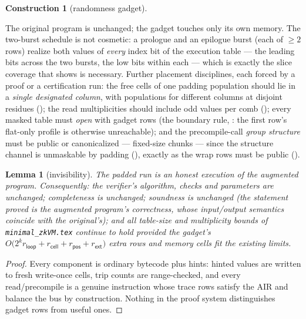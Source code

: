 \documentclass{article}
\newtheorem{lemma}[theorem]{Lemma}
\theoremstyle{definition}
\newtheorem{construction}[theorem]{Construction}
\begin{document}
\begin{construction}[randomness gadget]
\begin{itemize}
\end{itemize}
The original program is unchanged; the gadget touches only its own memory. The two-burst schedule is not cosmetic: a prologue and an epilogue burst (each of $\geq 2$ rows) realize both values of \emph{every} index bit of the execution table --- the leading bits across the two bursts, the low bits within each --- which is exactly the slice coverage that  shows is necessary. Further placement disciplines, each forced by a proof or a certification run: the free cells of one padding population should lie in a \emph{single designated column}, with populations for different columns at disjoint residues (); the read multiplicities should include odd values per comb (); every masked table must \emph{open} with gadget rows (the boundary rule, : the first row's flat-only profile is otherwise unreachable); and the precompile-call \emph{group structure} must be public or canonicalized --- fixed-size chunks --- since the structure channel is unmaskable by padding (), exactly as the wrap rows must be public ().
\end{construction}

\begin{lemma}[invisibility]\label{lem:invisible}
The padded run is an honest execution of the augmented program. Consequently: the verifier's algorithm, checks and parameters are unchanged; completeness is unchanged; soundness is unchanged (the statement proved is the augmented program's correctness, whose input/output semantics coincide with the original's); and all table-size and multiplicity bounds of \texttt{minimal\_zkVM.tex} continue to hold provided the gadget's $O\big(2^k r_{\mathsf{loop}} + r_{\mathsf{cell}} + r_{\mathsf{pos}} + r_{\mathsf{ext}}\big)$ extra rows and memory cells fit the existing limits.
\end{lemma}

\begin{proof}
Every component is ordinary bytecode plus hints: hinted values are written to fresh write-once cells, trip counts are range-checked, and every read/precompile is a genuine instruction whose trace rows satisfy the AIR and balance the bus by construction. Nothing in the proof system distinguishes gadget rows from useful ones.
\end{proof}
\end{document}
